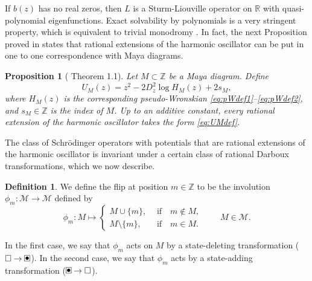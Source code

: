 \documentclass[10pt]{amsart}
\newtheorem{prop}[thm]{Proposition}
\theoremstyle{definition}
\newtheorem{definition}[thm]{Definition}
\numberwithin{equation}{section}
\numberwithin{figure}{section}
\newcommand{\Z}{\mathbb{Z}}
\newcommand{\R}{\mathbb{R}}
\renewcommand{\H}{H}%
\newcommand{\cL}{L}%
\newcommand{\cM}{\mathcal{M}}
\renewcommand{\boxdot}{{\ \clap{\raise0.25ex\hbox{$\bullet$}}\clap{$\square$}\ }}
\newcommand{\emptybox}{\hbox{$\square$}}
\begin{document}
If $b(z)$ has no real zeros, then $\cL$ is a Sturm-Liouville operator on $\R$ with quasi-polynomial eigenfunctions.  Exact solvability by polynomials is a very stringent property, which is equivalent to trivial monodromy \cite{refDG86,oblomkov1999monodromy}. In fact, the next Proposition proved in\cite{gomez2013rational} states that rational extensions of the harmonic oscillator can be put in one to one correspondence with Maya diagrams.


\begin{prop}[\cite{gomez2013rational} Theorem 1.1]
  \label{prop:ratext}
Let $M\subset \Z$ be a Maya diagram.  Define
\begin{equation}
  \label{eq:UMdef}
  U_M(z) = z^2 - 2 D_z^2 \log \H_M(z) + 2s_M,
\end{equation}
where $\H_M(z)$ is the corresponding pseudo-Wronskian \eqref{eq:pWdef1}--\eqref{eq:pWdef2}, and $s_M\in \Z$ is the index of $M$.
Up to an additive constant, every rational extension of the harmonic
  oscillator takes the form \eqref{eq:UMdef}.
\end{prop}

The class of Schr\"{o}dinger operators with potentials that are rational extensions of the harmonic oscillator is invariant
under a certain class of  rational Darboux transformations, which we
now describe.


\begin{definition}
We define the flip at position $m\in \Z$ to be the involution
$\phi_m:\cM\to \cM$ defined by
\begin{equation}\label{eq:flipdef}
 \phi_m : M \mapsto
\begin{cases}
   M \cup \{ m \}, & \text{if}\quad m\notin M, \\
   M \setminus \{ m \},\quad & \text{if}\quad m\in M.
\end{cases}\qquad M\in \cM.
\end{equation}
\end{definition}
\noindent
In the first case, we say that $\phi_m$ acts on $M$ by a
state-deleting transformation ($\emptybox\to \boxdot$).  In the second
case, we say that $\phi_m$ acts by a state-adding transformation
($\boxdot\to\emptybox$).
\end{document}
